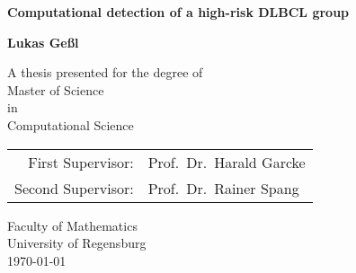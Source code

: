 \documentclass[10.5pt, a4paper, openright, twoside]{report}
\begin{document}
    \begin{titlepage}
        \centering
        \vspace*{1cm}
        
        \huge
        \textsf{
        \textbf{Computational detection of a high-risk DLBCL group}
        }
        
        \vspace{1.5cm}
        
        \large
        \textbf{Lukas Geßl}
        
        \vfill
        
        \large
        A thesis presented for the degree of\\
        Master of Science\\
        in\\
        Computational Science
        
        \vspace{0.8cm}
        
        \begin{tabular}{rl}
            First Supervisor: & Prof.\ Dr.\ Harald Garcke \\
            Second Supervisor: & Prof.\ Dr.\ Rainer Spang \\
        \end{tabular}
        
        \vspace{0.8cm}
        
        Faculty of Mathematics\\
        University of Regensburg\\
        \vspace{0.8cm}
        \today
        
    \end{titlepage}
\end{document}
